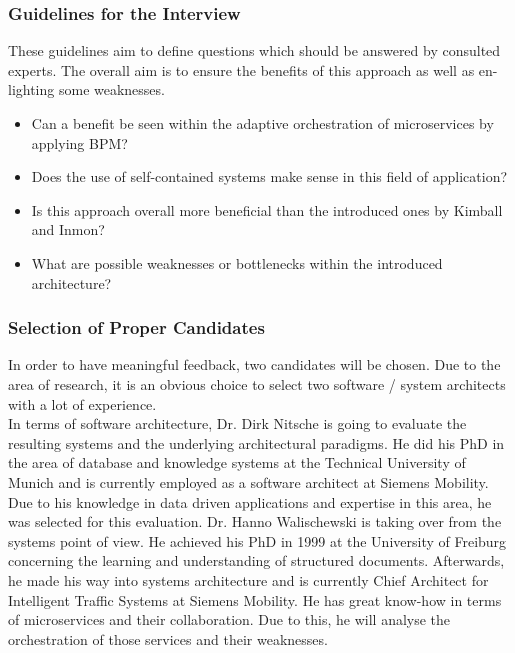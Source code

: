 \subsubsection{Guidelines for the Interview}
These guidelines aim to define questions which should be answered by consulted experts. The overall aim is to ensure the benefits of this approach as well as en-lighting some weaknesses. 
\begin{itemize}
    \item Can a benefit be seen within the adaptive orchestration of microservices by applying BPM?
    \item Does the use of self-contained systems make sense in this field of application?
    \item Is this approach overall more beneficial than the introduced ones by Kimball and Inmon?
    \item What are possible weaknesses or bottlenecks within the introduced architecture?
\end{itemize}

\subsubsection{Selection of Proper Candidates}
In order to have meaningful feedback, two candidates will be chosen. Due to the area of research, it is an obvious choice to select two software / system architects with a lot of experience.\newline
\\
In terms of software architecture, Dr. Dirk Nitsche is going to evaluate the resulting systems and the underlying architectural paradigms. He did his PhD in the area of database and knowledge systems at the Technical University of Munich and is currently employed as a software architect at Siemens Mobility. Due to his knowledge in data driven applications and expertise in this area, he was selected for this evaluation.\newline
Dr. Hanno Walischewski is taking over from the systems point of view. He achieved his PhD in 1999 at the University of Freiburg concerning the learning and understanding of structured documents. Afterwards, he made his way into systems architecture and is currently Chief Architect for Intelligent Traffic Systems at Siemens Mobility. He has great know-how in terms of microservices and their collaboration. Due to this, he will analyse the orchestration of those services and their weaknesses.

